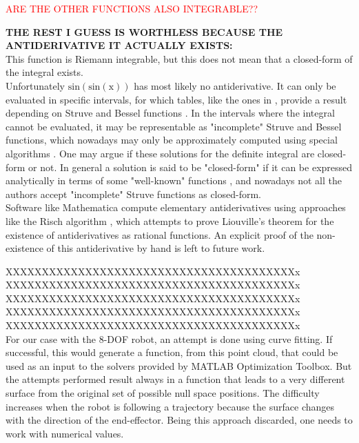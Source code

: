 \textcolor{red}{ARE THE OTHER FUNCTIONS ALSO INTEGRABLE??}
%

\textbf{THE REST I GUESS IS WORTHLESS BECAUSE THE ANTIDERIVATIVE IT ACTUALLY EXISTS:}\\
This function is Riemann integrable, but this does not mean that a closed-form of the integral exists. \\
Unfortunately $\mathrm{sin(sin(x))}$ has most likely no antiderivative. It can only be evaluated in specific intervals, for which tables, like the ones in \cite{hanbook_math}, provide a result depending on Struve and Bessel functions \cite{struve}. In the intervals where the integral cannot be evaluated, it may be representable as "incomplete" Struve and Bessel functions, which nowadays may only be approximately computed using special algorithms \cite{incomplete_bessel}. One may argue if these solutions for the definite integral are closed-form or not. In general a solution is said to be "closed-form" if it can be expressed analytically in terms of some "well-known" functions \cite{def_closed_form},  and nowadays not all the authors accept "incomplete" Struve functions as closed-form.  \\
Software like Mathematica compute elementary antiderivatives using approaches like the Risch algorithm \cite{risch}, which attempts to prove Liouville's theorem \cite{lioville} for the existence of antiderivatives as rational functions.  An explicit proof of the non-existence of this antiderivative  by hand is left to future work.

XXXXXXXXXXXXXXXXXXXXXXXXXXXXXXXXXXXXXXXXx \\
XXXXXXXXXXXXXXXXXXXXXXXXXXXXXXXXXXXXXXXXx \\
XXXXXXXXXXXXXXXXXXXXXXXXXXXXXXXXXXXXXXXXx \\
XXXXXXXXXXXXXXXXXXXXXXXXXXXXXXXXXXXXXXXXx \\
XXXXXXXXXXXXXXXXXXXXXXXXXXXXXXXXXXXXXXXXx \\





For our case with the 8-DOF robot, an attempt is done using curve fitting. If successful, this would generate a function, from this point cloud, that could be used as an input to the solvers provided by MATLAB Optimization Toolbox. But the attempts performed result always in a function that leads to a very different surface from the original  set of possible null space positions. The difficulty increases when the robot is following a trajectory because the surface changes with the direction of the end-effector. Being this approach discarded, one needs to work with numerical values. 





